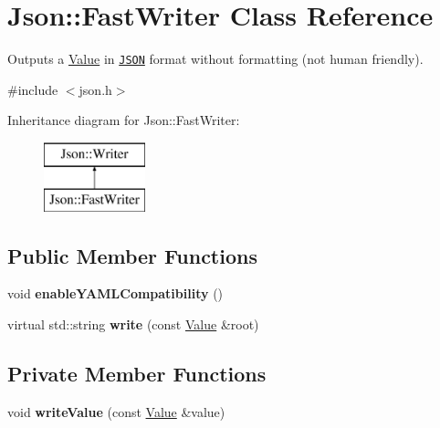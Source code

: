 \hypertarget{class_json_1_1_fast_writer}{\section{Json\-:\-:Fast\-Writer Class Reference}
\label{class_json_1_1_fast_writer}
}


Outputs a \hyperlink{class_json_1_1_value}{Value} in \href{http://www.json.org}{\tt J\-S\-O\-N} format without formatting (not human friendly).  




{\ttfamily \#include $<$json.\-h$>$}

Inheritance diagram for Json\-:\-:Fast\-Writer\-:\begin{figure}[H]
\begin{center}
\leavevmode
\includegraphics[height=2.000000cm]{class_json_1_1_fast_writer}
\end{center}
\end{figure}
\subsection*{Public Member Functions}
\begin{DoxyCompactItemize}
\item 
\hypertarget{class_json_1_1_fast_writer_a78d98e9f76d33660ad6e6a1abe287d45}{void {\bfseries enable\-Y\-A\-M\-L\-Compatibility} ()}\label{class_json_1_1_fast_writer_a78d98e9f76d33660ad6e6a1abe287d45}

\item 
\hypertarget{class_json_1_1_fast_writer_aa66218a56447222f91d64db618935a19}{virtual std\-::string {\bfseries write} (const \hyperlink{class_json_1_1_value}{Value} \&root)}\label{class_json_1_1_fast_writer_aa66218a56447222f91d64db618935a19}

\end{DoxyCompactItemize}
\subsection*{Private Member Functions}
\begin{DoxyCompactItemize}
\item 
\hypertarget{class_json_1_1_fast_writer_a2ef4a2ce13a341171f01f414f4fdd765}{void {\bfseries write\-Value} (const \hyperlink{class_json_1_1_value}{Value} \&value)}\label{class_json_1_1_fast_writer_a2ef4a2ce13a341171f01f414f4fdd765}

\end{DoxyCompactItemize}

